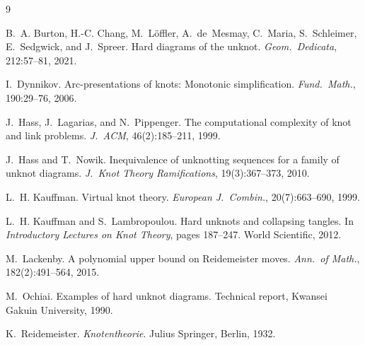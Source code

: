 \documentclass[a4paper,UKenglish,cleveref,autoref]{lipics-v2021}
\begin{document}
\begin{thebibliography}{9}

B.~A. Burton, H.-C. Chang, M.~L\"offler, A.~de~Mesmay, C.~Maria, S.~Schleimer, E.~Sedgwick, and J.~Spreer.
\newblock Hard diagrams of the unknot.
\newblock \emph{Geom.\ Dedicata}, 212:57--81, 2021.

I.~Dynnikov.
\newblock Arc-presentations of knots: Monotonic simplification.
\newblock \emph{Fund.\ Math.}, 190:29--76, 2006.

J.~Hass, J.~Lagarias, and N.~Pippenger.
\newblock The computational complexity of knot and link problems.
\newblock \emph{J.\ ACM}, 46(2):185--211, 1999.

J.~Hass and T.~Nowik.
\newblock Inequivalence of unknotting sequences for a family of unknot diagrams.
\newblock \emph{J.\ Knot Theory Ramifications}, 19(3):367--373, 2010.

L.~H. Kauffman.
\newblock Virtual knot theory.
\newblock \emph{European J.\ Combin.}, 20(7):663--690, 1999.

L.~H. Kauffman and S.~Lambropoulou.
\newblock Hard unknots and collapsing tangles.
\newblock In \emph{Introductory Lectures on Knot Theory}, pages 187--247. World Scientific, 2012.

M.~Lackenby.
\newblock A polynomial upper bound on Reidemeister moves.
\newblock \emph{Ann.\ of Math.}, 182(2):491--564, 2015.

M.~Ochiai.
\newblock Examples of hard unknot diagrams.
\newblock Technical report, Kwansei Gakuin University, 1990.

K.~Reidemeister.
\newblock \emph{Knotentheorie}.
\newblock Julius Springer, Berlin, 1932.

\end{thebibliography}
\end{document}
